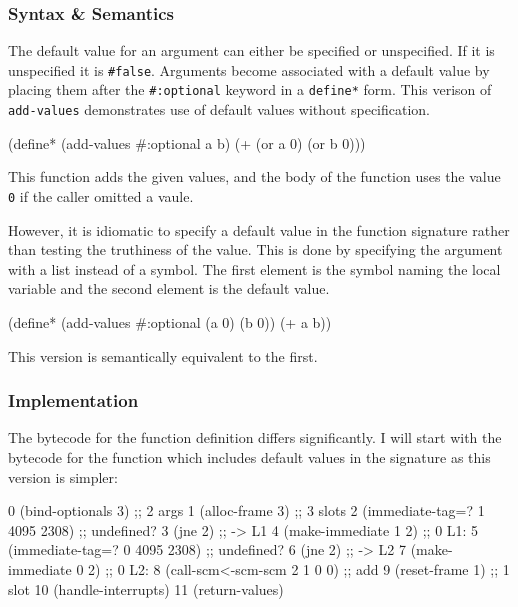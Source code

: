 \subsubsection{Syntax \& Semantics}
The default value for an argument can either be specified or unspecified.
If it is unspecified it is \texttt{\#false}.
Arguments become associated with a default value by placing them after the
\texttt{\#:optional} keyword in a \texttt{define*} form.
This verison of \texttt{add-values} demonstrates use of default values without
specification.

\begin{pygmented}[lang=lisp]
(define* (add-values #:optional a b)
  (+ (or a 0) (or b 0)))
\end{pygmented}

This function adds the given values, and the body of the function uses the value
\texttt{0} if the caller omitted a vaule.

However, it is idiomatic to specify a default value in the function signature rather than
testing the truthiness of the value.
This is done by specifying the argument with a list instead of a symbol.
The first element is the symbol naming the local variable and the second element is the
default value.

\begin{pygmented}[lang=lisp]
(define* (add-values #:optional (a 0) (b 0))
  (+ a b))
\end{pygmented}

This version is semantically equivalent to the first.

\subsubsection{Implementation}
The bytecode for the function definition differs significantly.
I will start with the bytecode for the function which includes default values in the
signature as this version is simpler:

\begin{pygmented}[lang=lisp]
   0    (bind-optionals 3)              ;; 2 args
   1    (alloc-frame 3)                 ;; 3 slots
   2    (immediate-tag=? 1 4095 2308)   ;; undefined?
   3    (jne 2)                         ;; -> L1
   4    (make-immediate 1 2)            ;; 0
L1:
   5    (immediate-tag=? 0 4095 2308)   ;; undefined?
   6    (jne 2)                         ;; -> L2
   7    (make-immediate 0 2)            ;; 0
L2:
   8    (call-scm<-scm-scm 2 1 0 0)     ;; add
   9    (reset-frame 1)                 ;; 1 slot
  10    (handle-interrupts)
  11    (return-values)
\end{pygmented}

